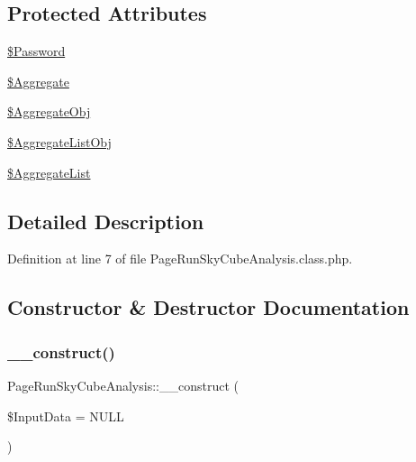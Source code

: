 \subsection*{Protected Attributes}
\begin{DoxyCompactItemize}
\item 
\hyperlink{class_page_run_sky_cube_analysis_a6d00aae4763338dde2894642c6e57779}{\$\+Password}
\item 
\hyperlink{class_page_run_sky_cube_analysis_afa3e02a2ca4870e95d452d531d2be406}{\$\+Aggregate}
\item 
\hyperlink{class_page_run_sky_cube_analysis_ae029c78df5bdad32a54d3a771c542a4b}{\$\+Aggregate\+Obj}
\item 
\hyperlink{class_page_run_sky_cube_analysis_a6a56b69f60c9700de21eed4f2fb4587e}{\$\+Aggregate\+List\+Obj}
\item 
\hyperlink{class_page_run_sky_cube_analysis_a618098511cb7d09fd24ee521011e66bc}{\$\+Aggregate\+List}
\end{DoxyCompactItemize}


\subsection{Detailed Description}


Definition at line 7 of file Page\+Run\+Sky\+Cube\+Analysis.\+class.\+php.



\subsection{Constructor \& Destructor Documentation}
\mbox{\label{class_page_run_sky_cube_analysis_afee4c044a994602e29c85902c3a98577}} 
\subsubsection{\texorpdfstring{\+\_\+\+\_\+construct()}{\_\_construct()}}
{\footnotesize\ttfamily Page\+Run\+Sky\+Cube\+Analysis\+::\+\_\+\+\_\+construct (\begin{DoxyParamCaption}\item[{}]{\$\+Input\+Data = {\ttfamily NULL} }\end{DoxyParamCaption})}



